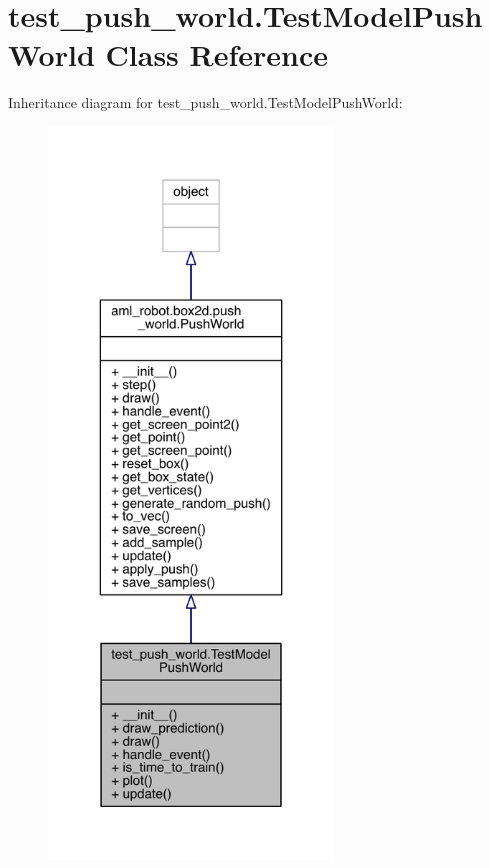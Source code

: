 \hypertarget{classtest__push__world_1_1_test_model_push_world}{}\section{test\+\_\+push\+\_\+world.\+Test\+Model\+Push\+World Class Reference}
\label{classtest__push__world_1_1_test_model_push_world}


Inheritance diagram for test\+\_\+push\+\_\+world.\+Test\+Model\+Push\+World\+:\nopagebreak
\begin{figure}[H]
\begin{center}
\leavevmode
\includegraphics[height=550pt]{classtest__push__world_1_1_test_model_push_world__inherit__graph}
\end{center}
\end{figure}


